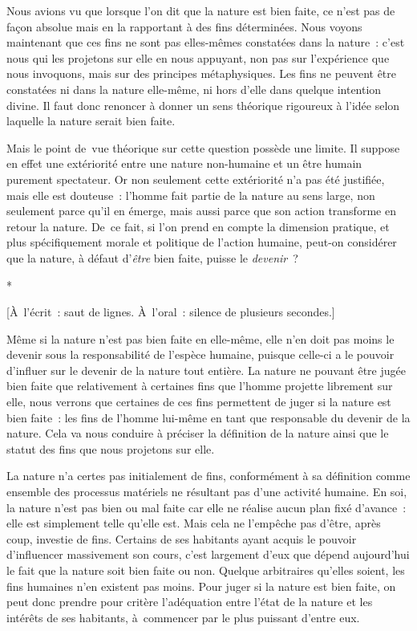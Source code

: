 \documentclass[a4paper,12pt]{report}
\begin{document}
Nous avions vu que lorsque l'on dit que
la nature est bien faite, ce n'est pas de façon absolue mais en la
rapportant à des fins déterminées. Nous voyons maintenant que ces fins
ne sont pas elles-mêmes constatées dans la nature : c'est nous qui les
projetons sur elle en nous appuyant, non pas sur l'expérience que nous
invoquons, mais sur des principes métaphysiques. Les fins ne peuvent
être constatées ni dans la nature elle-même, ni hors d'elle dans quelque
intention divine. Il faut donc renoncer à donner un sens théorique
rigoureux à l'idée selon laquelle la nature serait bien faite.

Mais le point de vue théorique sur cette question
possède une limite. Il suppose en effet une extériorité entre une nature
non-humaine et un être humain purement spectateur. Or non seulement
cette extériorité n'a pas été justifiée, mais elle est douteuse :
l'homme fait partie de la nature au sens large, non seulement parce
qu'il en émerge, mais aussi parce que son action transforme en retour la
nature. De ce fait, si l'on prend en compte la dimension pratique, et
plus spécifiquement morale et politique de l'action humaine, peut-on
considérer que la nature, à défaut d'\emph{être} bien faite, puisse le
\emph{devenir} ?

\begin{center}
*

[À l'écrit : saut de lignes. À l'oral : silence de plusieurs secondes.]
\end{center}

Même si la nature n'est pas bien faite en
elle-même, elle n'en doit pas moins le devenir sous la responsabilité de
l'espèce humaine, puisque celle-ci a le pouvoir d'influer sur le devenir
de la nature tout entière. La nature ne pouvant être jugée bien faite
que relativement à certaines fins que l'homme projette librement sur
elle, nous verrons que certaines de ces fins permettent de juger si la
nature est bien faite : les fins de l'homme lui-même en tant que
responsable du devenir de la nature. Cela va nous conduire à préciser la
définition de la nature ainsi que le statut des fins que nous projetons
sur elle.

La nature n'a certes pas initialement de fins,
conformément à sa définition comme ensemble des processus matériels ne
résultant pas d'une activité humaine. En soi, la nature n'est pas bien
ou mal faite car elle ne réalise aucun plan fixé d'avance : elle est
simplement telle qu'elle est. Mais cela ne l'empêche pas d'être, après
coup, investie de fins. Certains de ses habitants ayant acquis le
pouvoir d'influencer massivement son cours,
c'est largement d'eux que dépend aujourd'hui le fait que la nature soit
bien faite ou non. Quelque arbitraires qu'elles soient, les fins
humaines n'en existent pas moins. Pour juger
si la nature est bien faite, on peut donc prendre pour critère
l'adéquation entre l'état de la nature et les intérêts de ses habitants,
à commencer par le plus puissant d'entre eux.
\end{document}
